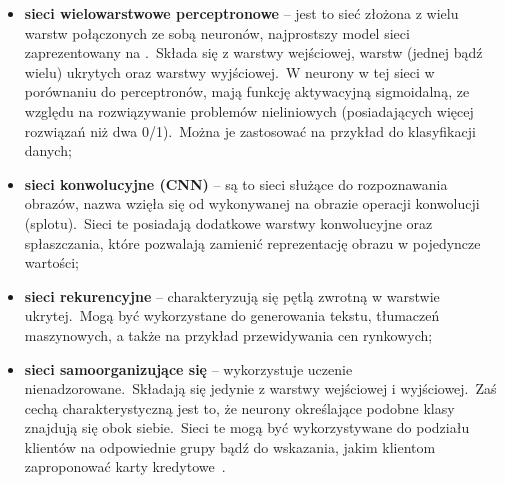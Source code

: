 \begin{itemize}
    \item \textbf{sieci wielowarstwowe perceptronowe} -- jest to sieć złożona z wielu warstw połączonych ze sobą neuronów, najprostszy model sieci zaprezentowany na .\ Składa się z warstwy wejściowej, warstw (jednej bądź wielu) ukrytych oraz warstwy wyjściowej.\ W neurony w tej sieci w porównaniu do perceptronów, mają funkcję aktywacyjną sigmoidalną, ze względu na rozwiązywanie problemów nieliniowych (posiadających więcej rozwiązań niż dwa 0/1).\ Można je zastosować na przykład do klasyfikacji danych;
    \item \textbf{sieci konwolucyjne (CNN)} -- są to sieci służące do rozpoznawania obrazów, nazwa wzięła się od wykonywanej na obrazie operacji konwolucji (splotu).\ Sieci te posiadają dodatkowe warstwy konwolucyjne oraz spłaszczania, które pozwalają zamienić reprezentację obrazu w pojedyncze wartości;
    \item \textbf{sieci rekurencyjne} -- charakteryzują się pętlą zwrotną w warstwie ukrytej.\ Mogą być wykorzystane do generowania tekstu, tłumaczeń maszynowych, a także na przykład przewidywania cen rynkowych;
    \item \textbf{sieci samoorganizujące się} -- wykorzystuje uczenie nienadzorowane.\ Składają się jedynie z warstwy wejściowej i wyjściowej.\ Zaś cechą charakterystyczną jest to, że neurony określające podobne klasy znajdują się obok siebie.\ Sieci te mogą być wykorzystywane do podziału klientów na odpowiednie grupy bądź do wskazania, jakim klientom zaproponować karty kredytowe~\cite{IBMNetwork, BartosSOM}.
\end{itemize}

